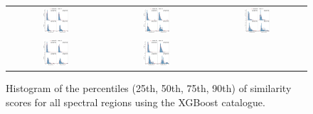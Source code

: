 \documentclass{aa}
\begin{document}
\begin{appendix}
\begin{figure}[htbp]
    \centering
    \begin{tabular}{ccc}
        \includegraphics[width=0.28\textwidth]{Plots/simil_thresh_hists/simil_thresh_histograms_R2_andrae23.pdf} & \includegraphics[width=0.28\textwidth]{Plots/simil_thresh_hists/simil_thresh_histograms_R3_andrae23.pdf} & \includegraphics[width=0.28\textwidth]{Plots/simil_thresh_hists/simil_thresh_histograms_R4_andrae23.pdf}\\ \includegraphics[width=0.28\textwidth]{Plots/simil_thresh_hists/simil_thresh_histograms_R5_andrae23.pdf} &  \includegraphics[width=0.28\textwidth]{Plots/simil_thresh_hists/simil_thresh_histograms_R6_andrae23.pdf} & 
        \\
    \end{tabular}
    \caption{Histogram of the percentiles (25th, 50th, 75th, 90th) of similarity scores for all spectral regions using the XGBoost catalogue.}
\end{figure}


\end{appendix}
\end{document}
